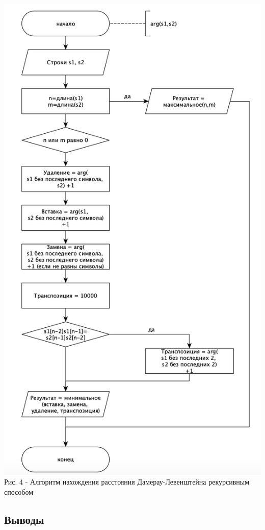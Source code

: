 \documentclass[a4paper,14pt]{article} %
\begin{document}
	\begin{center}
        		\includegraphics[scale = 1]{shema3} \\ Рис. 4 - Алгоритм нахождения расстояния Дамерау-Левенштейна рекурсивным способом
	\end{center}	
	
	\subsection{Выводы}
	\hfill
	
\end{document}

